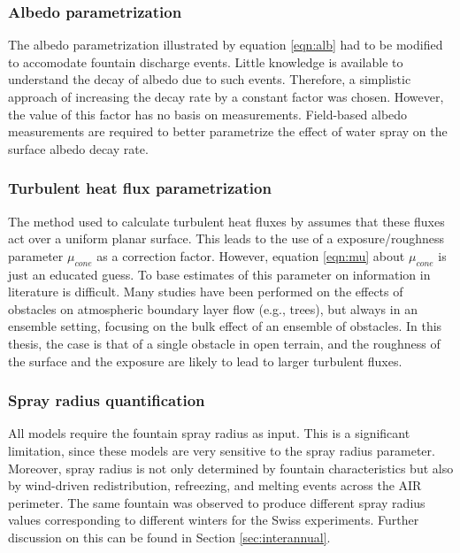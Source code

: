 \subsubsection{Albedo parametrization}

The albedo parametrization illustrated by equation \ref{eqn:alb} had to be modified to accomodate fountain
discharge events. Little knowledge is available to understand the decay of albedo due to such events. Therefore,
a simplistic approach of increasing the decay rate by a constant factor was chosen. However, the value of this
factor has no basis on measurements. Field-based albedo measurements are required to better
parametrize the effect of water spray on the surface albedo decay rate.

\subsubsection{Turbulent heat flux parametrization}

The method used to calculate turbulent heat fluxes by \citet{garrattAtmosphericBoundaryLayer1992} assumes that
these fluxes act over a uniform planar surface. This leads to the use of a exposure/roughness parameter
$\mu_{cone}$ as a correction factor. However, equation \ref{eqn:mu} about $\mu_{cone}$ is just an
educated guess. To base estimates of this parameter on information in literature is difficult. Many studies
have been performed on the effects of obstacles on atmospheric boundary layer flow (e.g., trees), but always in
an ensemble setting, focusing on the bulk effect of an ensemble of obstacles. In this thesis, the case is that of a single
obstacle in open terrain, and the roughness of the surface and the exposure are likely to lead to
larger turbulent fluxes.

\subsubsection{Spray radius quantification}

All models require the fountain spray radius as input. This is a significant limitation, since
these models are very sensitive to the spray radius parameter. Moreover, spray radius is not only determined by
fountain characteristics but also by wind-driven redistribution, refreezing, and melting events across
the \ac{AIR} perimeter. The same fountain was observed to produce different spray radius values corresponding to different
winters for the Swiss experiments. Further discussion on this can be found in Section \ref{sec:interannual}.

